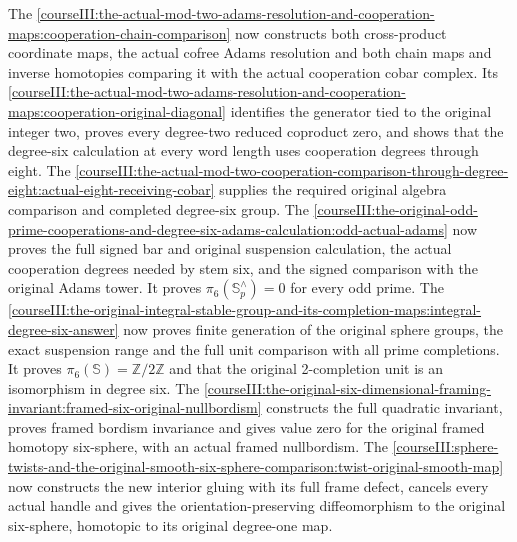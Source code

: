 The \cref{courseIII:the-actual-mod-two-adams-resolution-and-cooperation-maps:cooperation-chain-comparison} now constructs both cross-product coordinate maps, the actual cofree Adams resolution and both chain maps and inverse homotopies comparing it with the actual cooperation cobar complex. Its \cref{courseIII:the-actual-mod-two-adams-resolution-and-cooperation-maps:cooperation-original-diagonal} identifies the generator tied to the original integer two, proves every degree-two reduced coproduct zero, and shows that the degree-six calculation at every word length uses cooperation degrees through eight. The \cref{courseIII:the-actual-mod-two-cooperation-comparison-through-degree-eight:actual-eight-receiving-cobar} supplies the required original algebra comparison and completed degree-six group. The \cref{courseIII:the-original-odd-prime-cooperations-and-degree-six-adams-calculation:odd-actual-adams} now proves the full signed bar and original suspension calculation, the actual cooperation degrees needed by stem six, and the signed comparison with the original Adams tower. It proves \(\pi_6(\mathbb S^{\wedge}_p)=0\) for every odd prime. The \cref{courseIII:the-original-integral-stable-group-and-its-completion-maps:integral-degree-six-answer} now proves finite generation of the original sphere groups, the exact suspension range and the full unit comparison with all prime completions. It proves \(\pi_6(\mathbb S)=\mathbb Z/2\mathbb Z\) and that the original 2-completion unit is an isomorphism in degree six. The \cref{courseIII:the-original-six-dimensional-framing-invariant:framed-six-original-nullbordism} constructs the full quadratic invariant, proves framed bordism invariance and gives value zero for the original framed homotopy six-sphere, with an actual framed nullbordism. The \cref{courseIII:sphere-twists-and-the-original-smooth-six-sphere-comparison:twist-original-smooth-map} now constructs the new interior gluing with its full frame defect, cancels every actual handle and gives the orientation-preserving diffeomorphism to the original six-sphere, homotopic to its original degree-one map.
